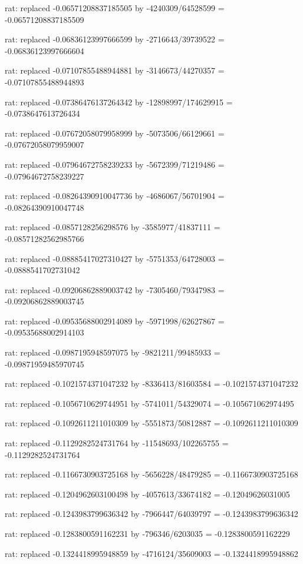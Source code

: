 \documentclass[a4paper,10pt]{article}
\begin{document}
\begin{eulernotebook}
\begin{eulercomment}
\begin{eulercomment}
\begin{eulercomment}
\begin{eulercomment}
\begin{eulercomment}
\begin{eulercomment}
\begin{eulercomment}
\begin{eulercomment}
\begin{eulercomment}
\begin{eulercomment}
\begin{eulercomment}
\begin{eulercomment}
\begin{eulercomment}
\begin{eulercomment}
\begin{eulercomment}
\begin{eulercomment}
\begin{euleroutput}
  rat: replaced -0.06571208837185505 by -4240309/64528599 = -0.06571208837185509
  
  rat: replaced -0.06836123997666599 by -2716643/39739522 = -0.06836123997666604
  
  rat: replaced -0.07107855488944881 by -3146673/44270357 = -0.07107855488944893
  
  rat: replaced -0.07386476137264342 by -12898997/174629915 = -0.0738647613726434
  
  rat: replaced -0.07672058079958999 by -5073506/66129661 = -0.07672058079959007
  
  rat: replaced -0.07964672758239233 by -5672399/71219486 = -0.07964672758239227
  
  rat: replaced -0.08264390910047736 by -4686067/56701904 = -0.08264390910047748
  
  rat: replaced -0.0857128256298576 by -3585977/41837111 = -0.08571282562985766
  
  rat: replaced -0.08885417027310427 by -5751353/64728003 = -0.0888541702731042
  
  rat: replaced -0.09206862889003742 by -7305460/79347983 = -0.09206862889003745
  
  rat: replaced -0.09535688002914089 by -5971998/62627867 = -0.09535688002914103
  
  rat: replaced -0.0987195948597075 by -9821211/99485933 = -0.09871959485970745
  
  rat: replaced -0.1021574371047232 by -8336413/81603584 = -0.1021574371047232
  
  rat: replaced -0.1056710629744951 by -5741011/54329074 = -0.105671062974495
  
  rat: replaced -0.1092611211010309 by -5551873/50812887 = -0.1092611211010309
  
  rat: replaced -0.1129282524731764 by -11548693/102265755 = -0.1129282524731764
  
  rat: replaced -0.1166730903725168 by -5656228/48479285 = -0.1166730903725168
  
  rat: replaced -0.1204962603100498 by -4057613/33674182 = -0.12049626031005
  
  rat: replaced -0.1243983799636342 by -7966447/64039797 = -0.1243983799636342
  
  rat: replaced -0.1283800591162231 by -796346/6203035 = -0.1283800591162229
  
  rat: replaced -0.1324418995948859 by -4716124/35609003 = -0.1324418995948862
  

\end{euleroutput}
\end{eulercomment}
\end{eulercomment}
\end{eulercomment}
\end{eulercomment}
\end{eulercomment}
\end{eulercomment}
\end{eulercomment}
\end{eulercomment}
\end{eulercomment}
\end{eulercomment}
\end{eulercomment}
\end{eulercomment}
\end{eulercomment}
\end{eulercomment}
\end{eulercomment}
\end{eulercomment}
\end{eulernotebook}
\end{document}
